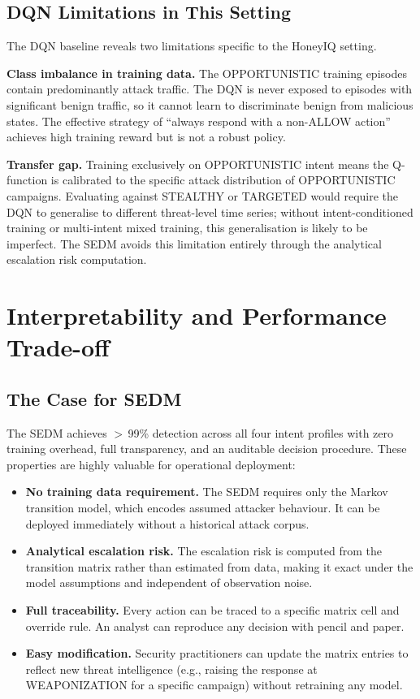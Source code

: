 \subsection{DQN Limitations in This Setting}

The DQN baseline reveals two limitations specific to the HoneyIQ setting.

\textbf{Class imbalance in training data.}
The OPPORTUNISTIC training episodes contain predominantly attack traffic.
The DQN is never exposed to episodes with significant benign traffic,
so it cannot learn to discriminate benign from malicious states.
The effective strategy of ``always respond with a non-ALLOW action'' achieves
high training reward but is not a robust policy.

\textbf{Transfer gap.}
Training exclusively on OPPORTUNISTIC intent means the Q-function is
calibrated to the specific attack distribution of OPPORTUNISTIC campaigns.
Evaluating against STEALTHY or TARGETED would require the DQN to generalise
to different threat-level time series; without intent-conditioned training
or multi-intent mixed training, this generalisation is likely to be
imperfect.
The SEDM avoids this limitation entirely through the analytical escalation
risk computation.

\section{Interpretability and Performance Trade-off}
\label{sec:disc_tradeoff}

\subsection{The Case for SEDM}

The SEDM achieves $>$\,99\% detection across all four intent profiles with
zero training overhead, full transparency, and an auditable decision
procedure.
These properties are highly valuable for operational deployment:
%
\begin{itemize}
  \item \textbf{No training data requirement.}
        The SEDM requires only the Markov transition model, which encodes
        assumed attacker behaviour.
        It can be deployed immediately without a historical attack corpus.
  \item \textbf{Analytical escalation risk.}
        The escalation risk is computed from the transition matrix rather
        than estimated from data, making it exact under the model assumptions
        and independent of observation noise.
  \item \textbf{Full traceability.}
        Every action can be traced to a specific matrix cell and override
        rule.
        An analyst can reproduce any decision with pencil and paper.
  \item \textbf{Easy modification.}
        Security practitioners can update the matrix entries to reflect new
        threat intelligence (e.g., raising the response at WEAPONIZATION
        for a specific campaign) without retraining any model.
\end{itemize}

